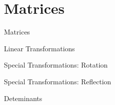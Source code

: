 \section{Matrices}

\begin{frame}{Matrices}

\end{frame}


\begin{frame}{Linear Transformations}

\end{frame}

\begin{frame}{Special Transformations: Rotation}

\end{frame}

\begin{frame}{Special Transformations: Reflection}

\end{frame}

\begin{frame}{Deteminants}

\end{frame}
